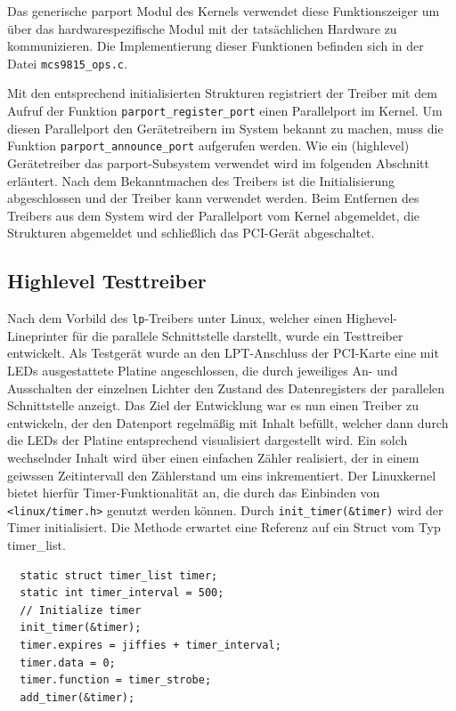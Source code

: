 \documentclass[a4paper,11pt]{article}
\begin{document}
Das generische parport Modul des Kernels verwendet diese Funktionszeiger um über das hardwarespezifische Modul mit 
der tatsächlichen Hardware zu kommunizieren.
Die Implementierung dieser Funktionen befinden sich in der Datei \verb|mcs9815_ops.c|. 

Mit den entsprechend initialisierten Strukturen registriert der Treiber mit dem Aufruf der Funktion \verb|parport_register_port| einen Parallelport im Kernel.
Um diesen Parallelport den Gerätetreibern im System bekannt zu machen, muss die Funktion \verb|parport_announce_port| aufgerufen werden.
Wie ein (highlevel) Gerätetreiber das parport-Subsystem verwendet wird im folgenden Abschnitt erläutert.
Nach dem Bekanntmachen des Treibers ist die Initialisierung abgeschlossen und der Treiber kann verwendet werden.
Beim Entfernen des Treibers aus dem System wird der Parallelport vom Kernel abgemeldet, die Strukturen abgemeldet und schließlich das PCI-Gerät 
abgeschaltet.

\subsection{Highlevel Testtreiber}

Nach dem Vorbild des \verb|lp|-Treibers unter Linux, welcher einen Highevel-Lineprinter für die parallele Schnittstelle darstellt, wurde ein Testtreiber entwickelt. Als Testgerät wurde an den LPT-Anschluss der PCI-Karte eine mit LEDs ausgestattete Platine angeschlossen, die durch jeweiliges An- und Ausschalten der einzelnen Lichter den Zustand des Datenregisters der parallelen Schnittstelle anzeigt. Das Ziel der Entwicklung war es nun einen Treiber zu entwickeln, der den Datenport regelmäßig mit Inhalt befüllt, welcher dann durch die LEDs der Platine entsprechend visualisiert dargestellt wird. 
Ein solch wechselnder Inhalt wird über einen einfachen Zähler realisiert, der in einem geiwssen Zeitintervall den Zählerstand um eins inkrementiert. Der Linuxkernel bietet hierfür Timer-Funktionalität an, die durch das Einbinden von \verb|<linux/timer.h>| genutzt werden können. Durch \verb|init_timer(&timer)| wird der Timer initialisiert. Die Methode erwartet eine Referenz auf ein Struct vom Typ timer\_list. 
\begin{verbatim}
  static struct timer_list timer;
  static int timer_interval = 500;
  // Initialize timer
  init_timer(&timer);
  timer.expires = jiffies + timer_interval;
  timer.data = 0;
  timer.function = timer_strobe;
  add_timer(&timer);
\end{verbatim}
\end{document}
